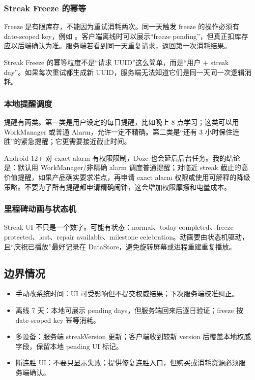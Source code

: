 \subsubsection{Streak Freeze 的幂等}

Freeze 是有限库存，不能因为重试消耗两次。同一天触发 freeze 的操作必须有 date-scoped key，例如 。客户端离线时可以展示“freeze pending”，但真正扣库存应以后端确认为准。服务端若看到同一天重复请求，返回第一次消耗结果。

\begin{keypoint}[同一天只能消耗一次]
Streak Freeze 的幂等粒度不是“请求 UUID”这么简单，而是“用户 + streak day”。如果每次重试都生成新 UUID，服务端无法知道它们是同一天同一次逻辑消耗。
\end{keypoint}

\subsubsection{本地提醒调度}

提醒有两类。第一类是用户设定的每日提醒，比如晚上 8 点学习；这类可以用 WorkManager 或普通 Alarm，允许一定不精确。第二类是“还有 3 小时保住连胜”的紧急提醒；它更需要接近截止时间。

Android 12+ 对 exact alarm 有权限限制，Doze 也会延后后台任务。我的结论是：默认用 WorkManager/非精确 alarm 调度普通提醒；对临近 streak 截止的高价值提醒，如果产品确实要求准点，再申请 exact alarm 权限或使用可解释的降级策略。不要为了所有提醒都申请精确闹钟，这会增加权限摩擦和电量成本。

\subsubsection{里程碑动画与状态机}

Streak UI 不只是一个数字。可能有状态：normal、today completed、freeze protected、lost、repair available、milestone celebration。动画要由状态机驱动，且“庆祝已播放”最好记录在 DataStore，避免旋转屏幕或进程重建重复播放。

\subsection{边界情况}

\begin{itemize}
  \item 手动改系统时间：UI 可受影响但不提交权威结果；下次服务端校准纠正。
  \item 离线 7 天：本地可展示 pending days，但服务端回来后逐日验证；freeze 按 date-scoped key 幂等消耗。
  \item 多设备：服务端 streakVersion 更新；客户端收到较新 version 后覆盖本地权威字段，保留本地 pending UI 标记。
  \item 断连胜 UI：不要只显示失败；提供修复连胜入口，但购买或消耗资源必须服务端确认。
\end{itemize}

